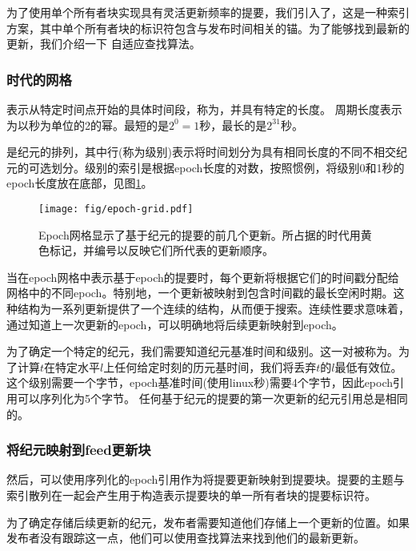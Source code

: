 \yellow{}

为了使用单个所有者块实现具有灵活更新频率的提要，我们引入了，这是一种索引方案，其中单个所有者块的标识符包含与发布时间相关的锚。为了能够找到最新的更新，我们介绍一下
自适应查找算法。 

\subsubsection{时代的网格}

表示从特定时间点开始的具体时间段，称为，并具有特定的长度。
周期长度表示为以秒为单位的2的幂。最短的是$2^0 = 1$秒，最长的是$2^{31}$秒。

是纪元的排列，其中行(称为级别)表示将时间划分为具有相同长度的不同不相交纪元的可选划分。级别的索引是根据epoch长度的对数，按照惯例，将级别0和1秒的epoch长度放在底部，见图\ref{fig:epoch-grid}。

\begin{figure}[htbp]
\centering
\texttt{[image: fig/epoch-grid.pdf]}
\caption[Epoch网格与基于纪元的feed updates\statusorange]{Epoch网格显示了基于纪元的提要的前几个更新。所占据的时代用黄色标记，并编号以反映它们所代表的更新顺序。 }
\label{fig:epoch-grid}
\end{figure}

当在epoch网格中表示基于epoch的提要时，每个更新将根据它们的时间戳分配给网格中的不同epoch。特别地，一个更新被映射到包含时间戳的最长空闲时期。这种结构为一系列更新提供了一个连续的结构，从而便于搜索。连续性要求意味着，通过知道上一次更新的epoch，可以明确地将后续更新映射到epoch。


为了确定一个特定的纪元，我们需要知道纪元基准时间和级别。这一对被称为。为了计算$t$在特定水平$l$上任何给定时刻的历元基时间，我们将丢弃$t$的$l$最低有效位。
这个级别需要一个字节，epoch基准时间(使用linux秒)需要4个字节，因此epoch引用可以序列化为5个字节。
任何基于纪元的提要的第一次更新的纪元引用总是相同的。

\subsubsection{将纪元映射到feed更新块}

然后，可以使用序列化的epoch引用作为将提要更新映射到提要块。提要的主题与索引散列在一起会产生用于构造表示提要块的单一所有者块的提要标识符。

为了确定存储后续更新的纪元，发布者需要知道他们存储上一个更新的位置。如果发布者没有跟踪这一点，他们可以使用查找算法来找到他们的最新更新。



